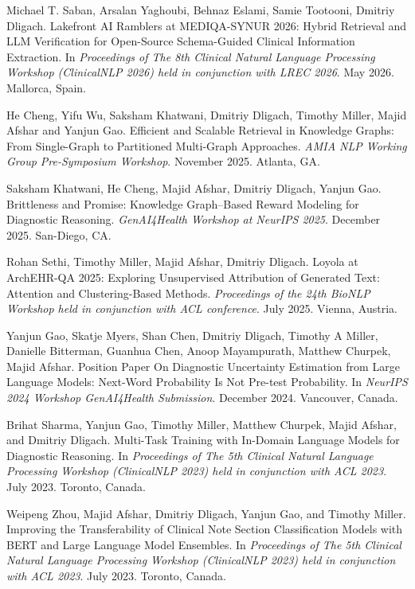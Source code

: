 \documentclass[letterpaper]{article}
\renewenvironment{itemize}{
  \begin{list}{}{
    \setlength{\leftmargin}{1.5em}
  }
}{
  \end{list}
}
\begin{document}
\begin{itemize}
\item Michael T. Saban, Arsalan Yaghoubi, Behnaz Eslami, Samie Tootooni, Dmitriy Dligach. Lakefront AI Ramblers at MEDIQA-SYNUR 2026: Hybrid Retrieval and LLM Verification for Open-Source Schema-Guided Clinical Information Extraction. In \emph{Proceedings of The 8th Clinical Natural Language Processing Workshop (ClinicalNLP 2026) held in conjunction with LREC 2026}. May 2026. Mallorca, Spain.
\item He Cheng, Yifu Wu, Saksham Khatwani, Dmitriy Dligach, Timothy Miller, Majid Afshar and Yanjun Gao. Efficient and Scalable Retrieval in Knowledge Graphs: From Single-Graph to Partitioned Multi-Graph Approaches. \emph{AMIA NLP Working Group Pre-Symposium Workshop}. November 2025. Atlanta, GA.
\item Saksham Khatwani, He Cheng, Majid Afshar, Dmitriy Dligach, Yanjun Gao. Brittleness and Promise: Knowledge Graph–Based Reward Modeling for Diagnostic Reasoning. \emph{GenAI4Health Workshop at NeurIPS 2025}. December 2025. San-Diego, CA. 
\item Rohan Sethi, Timothy Miller, Majid Afshar, Dmitriy Dligach. Loyola at ArchEHR-QA 2025: Exploring Unsupervised Attribution of Generated Text: Attention and Clustering-Based Methods. \emph{Proceedings of the 24th BioNLP Workshop held in conjunction with ACL conference}. July 2025. Vienna, Austria.
\item Yanjun Gao, Skatje Myers, Shan Chen, Dmitriy Dligach, Timothy A Miller, Danielle Bitterman, Guanhua Chen, Anoop Mayampurath, Matthew Churpek, Majid Afshar. Position Paper On Diagnostic Uncertainty Estimation from Large Language Models: Next-Word Probability Is Not Pre-test Probability. In \emph{NeurIPS 2024 Workshop GenAI4Health Submission}. December 2024. Vancouver, Canada.
\item Brihat Sharma, Yanjun Gao, Timothy Miller, Matthew Churpek, Majid Afshar, and Dmitriy Dligach. Multi-Task Training with In-Domain Language Models for Diagnostic Reasoning. In \emph{Proceedings of The 5th Clinical Natural Language Processing Workshop (ClinicalNLP 2023) held in conjunction with ACL 2023}. July 2023. Toronto, Canada.
\item Weipeng Zhou, Majid Afshar, Dmitriy Dligach, Yanjun Gao, and Timothy Miller. Improving the Transferability of Clinical Note Section Classification Models with BERT and Large Language Model Ensembles. In \emph{Proceedings of The 5th Clinical Natural Language Processing Workshop (ClinicalNLP 2023) held in conjunction with ACL 2023}. July 2023. Toronto, Canada.

\end{itemize}
\end{document}
